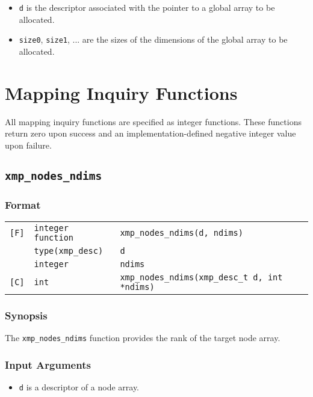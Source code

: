 \begin{itemize}
 \item {\tt d} is the descriptor associated with the pointer to a global
	   array to be allocated.
 \item {\tt size0}, {\tt size1}, ... are the sizes of the dimensions of
	   the global array to be allocated.
\end{itemize}


\section{Mapping Inquiry Functions}

All mapping inquiry functions are specified as integer functions.
These functions return zero upon success and an implementation-defined
negative integer value upon failure.

\subsection{\tt xmp\_nodes\_ndims}

\subsubsection*{Format}

\begin{tabular}{lll}

\verb![F]!& {\tt integer function}& {\tt xmp\_nodes\_ndims(d, ndims)}\\
          & {\tt type(xmp\_desc)} & {\tt d}\\
          & {\tt integer} & {\tt ndims}\\

\verb![C]!&  {\tt int}& {\tt xmp\_nodes\_ndims(xmp\_desc\_t d, int *ndims)}\\

\end{tabular}

\subsubsection*{Synopsis}

The {\tt xmp\_nodes\_ndims} function provides the rank of the target node
array.

\subsubsection*{Input Arguments}
\begin{itemize}
 \item {\tt d} is a descriptor of a node array.
\end{itemize}

